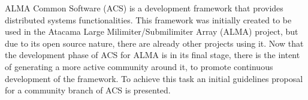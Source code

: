 ALMA Common Software (ACS) is a development framework that provides distributed systems functionalities. This framework was initially created to be used in the 
Atacama Large Milimiter/Submilimiter Array (ALMA) project, but due to its open source nature, there are already other projects using it. 
Now that the development phase of ACS for ALMA is in its final stage, there is the intent of generating a more active community around it, to promote continuous 
development of the framework.
To achieve this task an initial guidelines proposal for a community branch of ACS is presented.

